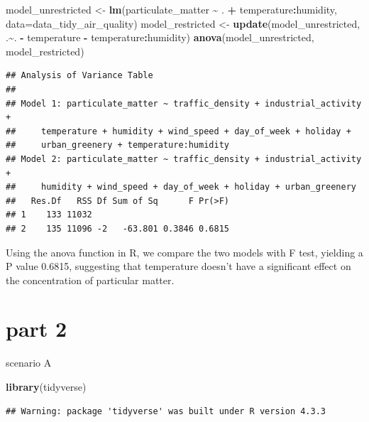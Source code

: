 \documentclass[
]{article}
\newenvironment{Shaded}{\begin{snugshade}}{\end{snugshade}}
\newcommand{\AttributeTok}[1]{\textcolor[rgb]{0.13,0.29,0.53}{#1}}
\newcommand{\FunctionTok}[1]{\textcolor[rgb]{0.13,0.29,0.53}{\textbf{#1}}}
\newcommand{\NormalTok}[1]{#1}
\newcommand{\OtherTok}[1]{\textcolor[rgb]{0.56,0.35,0.01}{#1}}
\newcommand{\SpecialCharTok}[1]{\textcolor[rgb]{0.81,0.36,0.00}{\textbf{#1}}}
\begin{document}
\begin{Shaded}
\begin{Highlighting}[]
\NormalTok{model\_unrestricted }\OtherTok{\textless{}{-}} \FunctionTok{lm}\NormalTok{(particulate\_matter }\SpecialCharTok{\textasciitilde{}}\NormalTok{ . }\SpecialCharTok{+} 
\NormalTok{                         temperature}\SpecialCharTok{:}\NormalTok{humidity,}
                         \AttributeTok{data=}\NormalTok{data\_tidy\_air\_quality)}
\NormalTok{model\_restricted }\OtherTok{\textless{}{-}} \FunctionTok{update}\NormalTok{(model\_unrestricted, .}\SpecialCharTok{\textasciitilde{}}\NormalTok{.}
                           \SpecialCharTok{{-}}\NormalTok{ temperature}
                           \SpecialCharTok{{-}}\NormalTok{ temperature}\SpecialCharTok{:}\NormalTok{humidity)}
\FunctionTok{anova}\NormalTok{(model\_unrestricted, model\_restricted)}
\end{Highlighting}
\end{Shaded}

\begin{verbatim}
## Analysis of Variance Table
## 
## Model 1: particulate_matter ~ traffic_density + industrial_activity + 
##     temperature + humidity + wind_speed + day_of_week + holiday + 
##     urban_greenery + temperature:humidity
## Model 2: particulate_matter ~ traffic_density + industrial_activity + 
##     humidity + wind_speed + day_of_week + holiday + urban_greenery
##   Res.Df   RSS Df Sum of Sq      F Pr(>F)
## 1    133 11032                           
## 2    135 11096 -2   -63.801 0.3846 0.6815
\end{verbatim}

Using the anova function in R, we compare the two models with F test,
yielding a P value 0.6815, suggesting that temperature doesn't have a
significant effect on the concentration of particular matter.

\hypertarget{part-2}{%
\section{part 2}\label{part-2}}

scenario A

\begin{Shaded}
\begin{Highlighting}[]
\FunctionTok{library}\NormalTok{(tidyverse)}
\end{Highlighting}
\end{Shaded}

\begin{verbatim}
## Warning: package 'tidyverse' was built under R version 4.3.3
\end{verbatim}
\end{document}
